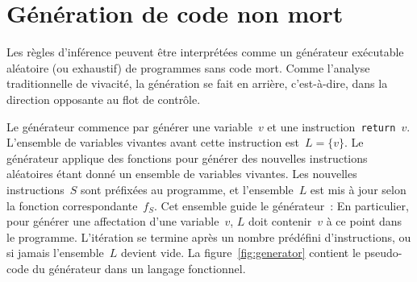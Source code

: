 \documentclass[a4paper]{easychair}
\begin{document}
\section{Génération de code non mort}

Les règles d'inférence peuvent être interprétées comme un générateur
exécutable aléatoire (ou exhaustif) de programmes sans code mort. Comme
l'analyse traditionnelle de vivacité, la génération se fait en arrière,
c'est-à-dire, dans la direction opposante au flot de contrôle.

Le générateur commence par générer une variable~\(v\) et une
instruction~\texttt{return \(v\)}. L'ensemble de variables vivantes avant
cette instruction est~\(L = \{v\}\). Le générateur applique des fonctions
pour générer des nouvelles instructions aléatoires étant donné un ensemble
de variables vivantes. Les nouvelles instructions~\(S\) sont préfixées au
programme, et l'ensemble~\(L\) est mis à jour selon la fonction
correspondante~\(f_S\). Cet ensemble guide le générateur~: En particulier,
pour générer une affectation d'une variable~\(v\), \(L\) doit contenir~\(v\)
à ce point dans le programme. L'itération se termine après un nombre
prédéfini d'instructions, ou si jamais l'ensemble~\(L\) devient vide. La
figure~\ref{fig:generator} contient le pseudo-code du générateur dans un
langage fonctionnel.
\end{document}
